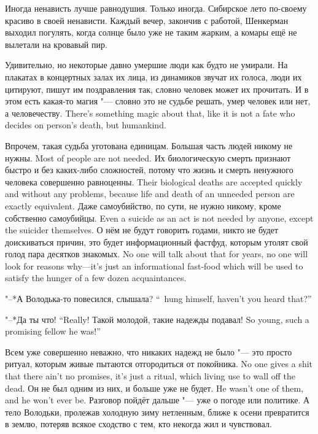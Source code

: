 Иногда ненависть лучше равнодушия.
Только иногда.
Сибирское лето по-своему красиво в своей ненависти.
Каждый вечер, закончив с работой, Шенкерман выходил погулять, когда солнце было уже не таким жарким, а комары ещё не вылетали на кровавый пир.

Удивительно, но некоторые давно умершие люди как будто не умирали.
На плакатах в концертных залах их лица, из динамиков звучат их голоса, люди их цитируют, пишут им поздравления так, словно человек может их прочитать.
{И в этом есть какая-то магия "--- словно это не судьбе решать, умер человек или нет, а человечеству.}
{There's something magic about that, like it is not a fate who decides on person's death, but humankind.}

Впрочем, такая судьба уготована единицам.
{Большая часть людей никому не нужны.}
{Most of people are not needed.}
{Их биологическую смерть признают быстро и без каких-либо сложностей, потому что жизнь и смерть ненужного человека совершенно равноценны.}
{Their biological deaths are accepted quickly and without any problems, because life and death of an unneeded person are exactly equivalent.}
{Даже самоубийство, по сути, не нужно никому, кроме собственно самоубийцы.}
{Even a suicide as an act is not needed by anyone, except the suicider themselves.}
{О нём не будут говорить годами, никто не будет доискиваться причин, это будет информационный фастфуд, которым утолят свой голод пара десятков знакомых.}
{No one will talk about that for years, no one will look for reasons why---it's just an informational fast-food which will be used to satisfy the hunger of a few dozen acquaintances.}

{"--*А Володька-то повесился, слышала?}
{``\Volodka\ hung himself, haven't you heard that?''}

{"--*Да ты что!}
{``Really!}
{Такой молодой, такие надежды подавал!}
{So young, such a promising fellow he was!''}

{Всем уже совершенно неважно, что никаких надежд не было "--- это просто ритуал, которым живые пытаются отгородиться от покойника.}
{No one gives a shit that there ain't no promises, it's just a ritual, which living use to wall off the dead.}
{Он не был одним из них, и больше уже не будет.}
{He wasn't one of them, and he won't ever be.}
Разговор пойдёт дальше "--- уже о погоде или политике.
А тело Володьки, пролежав холодную зиму нетленным, ближе к осени превратится в землю, потеряв всякое сходство с тем, кто некогда жил и чувствовал.

